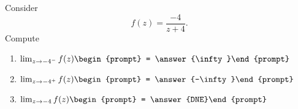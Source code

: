 \documentclass{ximera}
\author{Bart Snapp}
\begin{document}
\begin{exercise}
Consider 
\[
f(z) = \frac{-4}{z+4}.
\]
Compute
\begin{enumerate}
\item $\lim_{z\to -4^- } f(z) \begin{prompt} = \answer{\infty}\end{prompt}$
\item $\lim_{z\to -4^+ } f(z) \begin{prompt} = \answer{-\infty}\end{prompt}$
\item $\lim_{z\to -4 } f(z) \begin{prompt} = \answer{DNE}\end{prompt}$
\end{enumerate}
\end{exercise}
\end{document}
